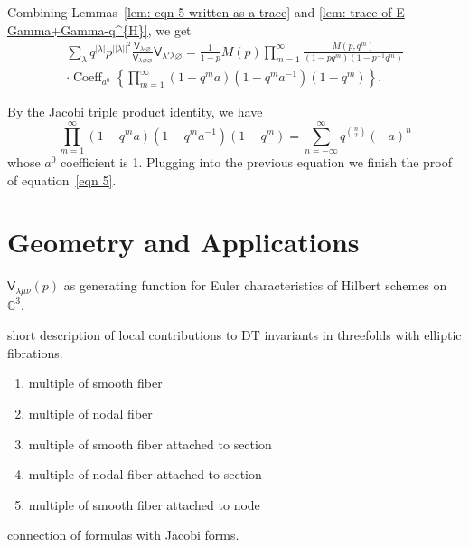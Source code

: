 \documentclass[12pt]{amsart}
\newcommand{\cnums} {{\mathbb C}}          %
\newcommand{\Vsf}{\mathsf{V}}
\newcommand{\bx}{\square}
\renewcommand{\emptyset}{\varnothing}
\theoremstyle{definition}
\begin{document}
Combining Lemmas~\ref{lem: eqn 5 written as a trace} and \ref{lem:
trace of E Gamma+Gamma-q^{H}}, we get
\begin{multline*}
\sum_{\lambda} q^{|\lambda |} p^{||\lambda ||^{2}} \frac{\Vsf_{\lambda
\bx \emptyset}}{\Vsf_{\lambda \emptyset \emptyset}} \Vsf_{\lambda
'\lambda \emptyset} =\frac{1}{1-p} M(p)\prod_{m=1}^{\infty}
\frac{M(p,q^{m})}{(1-pq^{m})(1-p^{-1}q^{m})}\\
 \cdot \operatorname{Coeff}_{a^{0}}\left\{\prod_{m=1}^{\infty}
(1-q^{m}a)(1-q^{m}a^{-1})(1-q^{m}) \right\}.
\end{multline*}

By the Jacobi triple product identity, we have
\[
\prod_{m=1}^{\infty} (1-q^{m}a)(1-q^{m}a^{-1})(1-q^{m}) =
\sum_{n=-\infty}^{\infty} q^{\binom{n}{2}} (-a)^{n}
\]
whose $a^{0}$ coefficient is 1. Plugging into the previous equation we
finish the proof of equation~\eqref{eqn 5}.

\section{Geometry and Applications}\label{sec: geometry and applications}

\smallskip

$\Vsf_{\lambda \mu \nu}(p)$ as generating function for Euler
characteristics of Hilbert schemes on $\cnums^{3}$.

\smallskip

short description of local contributions to DT invariants in
threefolds with elliptic fibrations. \begin{enumerate}
\item multiple of smooth fiber
\item multiple of nodal fiber
\item multiple of smooth fiber attached to section
\item multiple of nodal fiber attached to section
\item multiple of smooth fiber attached to node
\end{enumerate}

\smallskip
connection of formulas with Jacobi forms. 





\end{document}
